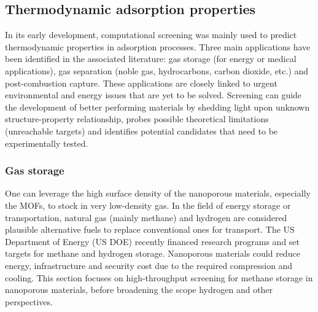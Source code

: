 \documentclass[main.tex]{subfiles}
\begin{document}
\subsection{Thermodynamic adsorption properties}

In its early development, computational screening was mainly used to predict thermodynamic properties in adsorption processes. Three main applications have been identified in the associated literature: gas storage (for energy or medical applications), gas separation (noble gas, hydrocarbons, carbon dioxide, etc.) and post-combustion  capture. These applications are closely linked to urgent environmental and energy issues that are yet to be solved. Screening can guide the development of better performing materials by shedding light upon unknown structure-property relationship, probes possible theoretical limitations (unreachable targets) and identifies potential candidates that need to be experimentally tested.

\subsubsection{Gas storage}

One can leverage the high surface density of the nanoporous materials, especially the MOFs, to stock in very low-density gas. In the field of energy storage or transportation, natural gas (mainly methane) and hydrogen are considered plausible alternative fuels to replace conventional ones for transport. The US Department of Energy (US DOE) recently financed research programs and set targets for methane and hydrogen storage. Nanoporous materials could reduce energy, infrastructure and security cost due to the required compression and cooling. This section focuses on high-throughput screening for methane storage in nanoporous materials, before broadening the scope hydrogen and other perspectives.
\end{document}
